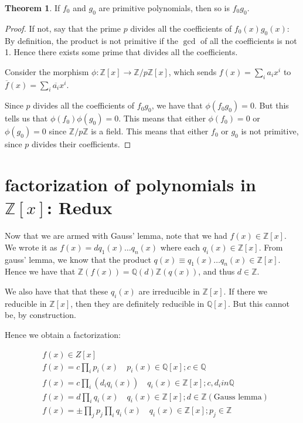 \documentclass{book}
\newcommand{\Z}{\ensuremath{\mathbb{Z}}}
\newcommand{\Q}{\ensuremath{\mathbb{Q}}}
\theoremstyle{definition}
\newtheorem{theorem}{Theorem}
\begin{document}
\begin{theorem}
    If $f_0$ and $g_0$ are primitive polynomials, then so is $f_0 g_0$.
\end{theorem}
\begin{proof}
    If not, say that the prime $p$ divides all the coefficients of $f_0(x) g_0(x)$:
    By definition, the product is not primitive if the $\gcd$ of all the coefficients
    is not 1. Hence there exists some prime that divides all the coefficients.


    Consider the morphism $\phi: \Z[x] \rightarrow \Z/p\Z[x]$, which sends $f(x) = \sum_i a_i x^i$
    to $\overline{f}(x) = \sum_i \overline{a_i}x^i$.

    Since $p$ divides all the coefficients of $f_0 g_0$, we have that $\phi(f_0 g_0) = 0$.
    But this tells us that $\phi(f_0) \phi(g_0) = 0$. This means that either $\phi(f_0) = 0$
    or $\phi(g_0) = 0$ since $\Z/p\Z$ is a field. This means that either $f_0$
    or $g_0$ is not primitive, since $p$ divides their coefficients.
\end{proof}


\section{factorization of polynomials in $\Z[x]$: Redux}
Now that we are armed with Gauss' lemma, note that we had $f(x) \in \Z[x]$.
We wrote it as $f(x) = d q_1(x) \dots q_n(x)$ where each $q_i(x) \in \Z[x]$.
From gauss' lemma, we know that the product
$q(x) \equiv q_1(x) \dots q_n(x) \in \Z[x]$.
Hence we have that $\Z (f(x)) = \Q(d) \Z (q(x))$, and thus $d \in \Z$.


We also have that that these $q_i(x)$ are irreducible in $\Z[x]$. If there we
reducible in $\Z[x]$, then they are definitely reducible in $\Q[x]$. But this
cannot be, by construction.


Hence we obtain a factorization:

\begin{align*}
&f(x) \in Z[x] \\
&f(x) = c \prod_i p_i(x) \quad p_i(x) \in \Q[x]; c \in \Q \\
&f(x) = c \prod_i (d_i q_i(x)) \quad q_i(x) \in \Z[x]; c, d_i in \Q \\
&f(x) = d \prod_i q_i(x) \quad q_i(x) \in \Z[x]; d \in \Z (\text{Gauss lemma})\\
&f(x) = \pm \prod_j p_j \prod_i q_i(x) \quad q_i(x) \in \Z[x]; p_j \in \Z 
\end{align*}
\end{document}

